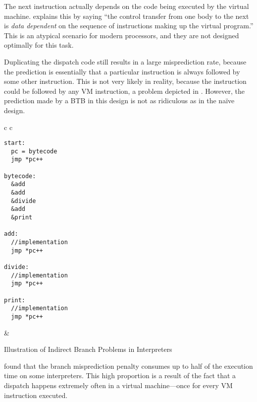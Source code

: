 		The next instruction actually depends on the code being executed by the virtual machine. \cite{yeti} explains this by saying ``the control transfer from one body to the next is \emph{data dependent} on the sequence of instructions making up the virtual program.'' This is an atypical scenario for modern processors, and they are not designed optimally for this task.
		
		Duplicating the dispatch code still results in a large misprediction rate, because the prediction is essentially that a particular instruction is always followed by some other instruction. This is not very likely in reality, because the instruction could be followed by any VM instruction, a problem depicted in . However, the prediction made by a BTB in this design is not as ridiculous as in the naïve design.
		
		\begin{myfigure}
			\begin{tabular}{c c}
				{
				\begin{lstlisting}
start:
  pc = bytecode
  jmp *pc++

bytecode:
  &add
  &add
  &divide
  &add
  &print

add:
  //implementation
  jmp *pc++

divide:
  //implementation
  jmp *pc++

print:
  //implementation
  jmp *pc++
				\end{lstlisting}
			} & 
			{
				\hspace{-9em}
			}
			\end{tabular}
			\caption{Illustration of Indirect Branch Problems in Interpreters}
			\label{fig:interpreterbtb}
		\end{myfigure}
		
		\cite{structureinterpreters} found that the branch misprediction penalty consumes up to half of the execution time on some interpreters. This high proportion is a result of the fact that a dispatch happens extremely often in a virtual machine---once for every VM instruction executed.
		

